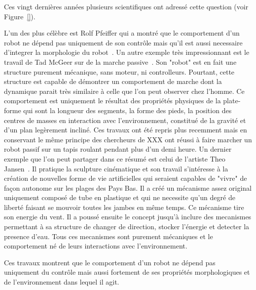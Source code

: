 Ces vingt dernières années plusieurs scientifiques ont adressé cette question (voir Figure~\ref{}).

\begin{figure}[tb]
\centering
    \hfil
    \newline
    \caption{}
    \label{fig:morphology_review_fr}
\end{figure}

L'un des plus célèbre est Rolf Pfeiffer qui a montré que le comportement d'un robot ne dépend pas uniquement de son contrôle mais qu'il est aussi necessaire d'integrer la morphologie du robot~\parencite{pfeifer2005morphological}. Un autre exemple très impressionnant est le travail de Tad McGeer sur de la marche passive~\parencite{mcgeer1992principles}. Son "robot" est en fait une structure purement mécanique, sans moteur, ni controlleurs. Pourtant, cette structure est capable de démontrer un comportement de marche dont la dynamique parait très similaire à celle que l'on peut observer chez l'homme. Ce comportement est uniquement le résultat des propriétés physiques de la plate-forme qui sont la longueur des segments, la forme des pieds, la position des centres de masses en interaction avec l'environnement, constitué de la gravité et d'un plan legèrement incliné. Ces travaux ont été repris plus recemment mais en conservant le même principe des chercheurs de XXX ont réussi à faire marcher un robot passif sur un tapis roulant pendant plus d'un demi heure. Un dernier exemple que l'on peut partager dans ce résumé est celui de l'artiste Theo Jansen~\parencite{jansen2007theo}. Il pratique la sculpture cinématique et son travail s'intéresse à la création de nouvelles forme de vie artificielles qui seraient capables de "vivre" de façon autonome sur les plages des Pays Bas. Il a créé un mécanisme assez original uniquement composé de tube en plastique et qui ne necessite qu'un degré de liberté faisant se mouvoir toutes les jambes en même temps. Ce mécanisme tire son energie du vent. Il a poussé ensuite le concept jusqu'à inclure des mecanismes permettant à sa structure de changer de direction, stocker l'énergie et detecter la presence d'eau. Tous ces mecanismes sont purement mécaniques et le comportement né de leurs interactions avec l'environnement.


Ces travaux montrent que le comportement d'un robot ne dépend pas uniquement du contrôle mais aussi fortement de ses propriétés morphologiques et de l'environnement dans lequel il agit.

